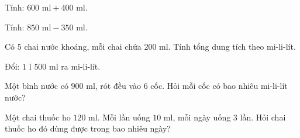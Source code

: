 \begin{ex} %
Tính: $600\text{ ml} + 400\text{ ml}$.
\end{ex}

\begin{ex} %
Tính: $850\text{ ml} - 350\text{ ml}$.
\end{ex}

\begin{ex} %
Có 5 chai nước khoáng, mỗi chai chứa $200\text{ ml}$. Tính tổng dung tích theo mi-li-lít.
\end{ex}

\begin{ex} %
Đổi: $1\text{ l } 500\text{ ml}$ ra mi-li-lít.
\end{ex}

\begin{ex} %
Một bình nước có $900\text{ ml}$, rót đều vào 6 cốc. Hỏi mỗi cốc có bao nhiêu mi-li-lít nước?
\end{ex}

\begin{ex} %
Một chai thuốc ho $120\text{ ml}$. Mỗi lần uống $10\text{ ml}$, mỗi ngày uống 3 lần. Hỏi chai thuốc ho đó dùng được trong bao nhiêu ngày?
\end{ex}
